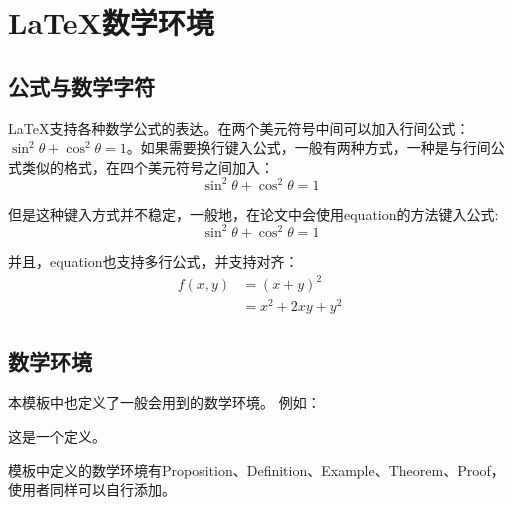 \chapter{\LaTeX 数学环境}

\section{公式与数学字符}

\LaTeX 支持各种数学公式的表达。在两个美元符号中间可以加入行间公式：$\sin ^2 \theta +\cos ^2 \theta = 1$。如果需要换行键入公式，一般有两种方式，一种是与行间公式类似的格式，在四个美元符号之间加入：
$$
\sin ^2 \theta +\cos ^2 \theta = 1
$$

但是这种键入方式并不稳定，一般地，在论文中会使用equation的方法键入公式:
\begin{equation}
\sin^2 \theta + \cos^2 \theta  =1
\end{equation}

并且，equation也支持多行公式，并支持对齐：
\begin{equation}
	\begin{aligned}
		f(x,y) &= (x+y)^2\\%
			& = x^2 + 2xy + y^2	
	\end{aligned}
\end{equation}

\section{数学环境}

本模板中也定义了一般会用到的数学环境。
例如：
\begin{Def}
这是一个定义。
\end{Def}

模板中定义的数学环境有Proposition、Definition、Example、Theorem、Proof，使用者同样可以自行添加。
